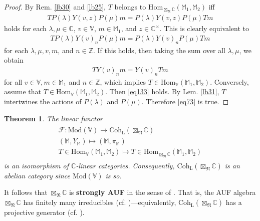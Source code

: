 \documentclass[11pt,b5paper,notitlepage]{article}
\theoremstyle{definition}
\theoremstyle{plain}
\newtheorem{thm}[df]{Theorem}
\newcommand{\Hom}{\mathrm{Hom}}
\newcommand{\scr}{\mathscr}
\newcommand{\Vbb}{\mathbb V}
\newcommand{\Mbb}{\mathbb M}
\newcommand{\Cbb}{\mathbb C}
\newcommand{\Zbb}{\mathbb Z}
\newcommand{\<}{\left\langle}
\renewcommand{\>}{\right\rangle}
\newcommand{\Mod}{\mathrm{Mod}}
\newcommand{\fn}{\mathfrak{N}}
\newcommand{\Coh}{{\mathrm{Coh}_{\mathrm L}}}
\numberwithin{equation}{section}
\begin{document}
\begin{proof}
By Rem. \ref{lb30} and \ref{lb25}, $T$ belongs to $\Hom_{\boxtimes_\fn\Cbb}(\Mbb_1,\Mbb_2)$ iff
\begin{align*}
TP(\lambda)Y(v,z)P(\mu)m=P(\lambda)Y(v,z)P(\mu)Tm
\end{align*}
holds for each $\lambda,\mu\in\Cbb$, $v\in\Vbb$, $m\in\Mbb_1$, and $z\in\Cbb^{\times}$. This is clearly equivalent to
\begin{align}\label{eq73}
TP(\lambda)Y(v)_nP(\mu)m=P(\lambda)Y(v)_nP(\mu)Tm
\end{align}
for each $\lambda,\mu,v,m$, and $n\in\Zbb$. If this holds, then taking the sum over all $\lambda,\mu$, we obtain
\begin{align}\label{eq133}
TY(v)_nm=Y(v)_nTm
\end{align}
for all $v\in\Vbb,m\in\Mbb_1$ and $n\in\Zbb$, which implies $T\in\Hom_\Vbb(\Mbb_1,\Mbb_2)$. Conversely, assume that $T\in\Hom_\Vbb(\Mbb_1,\Mbb_2)$. Then \eqref{eq133} holds. By Lem. \ref{lb31}, $T$ intertwines the actions of $P(\lambda)$ and $P(\mu)$. Therefore \eqref{eq73} is true.
\end{proof}




\begin{thm}\label{lb55}
The linear functor
\begin{gather}
\begin{gathered}
\scr F:\Mod(\Vbb)\rightarrow \Coh(\boxtimes_\fn\Cbb)\\
(\Mbb,Y_\Mbb)\mapsto (\Mbb,\pi_\Mbb)\\
T\in\Hom_\Vbb(\Mbb_1,\Mbb_2)\mapsto T\in\Hom_{\boxtimes_\fn\Cbb}(\Mbb_1,\Mbb_2)
\end{gathered}
\end{gather}
is an isomorphism of $\Cbb$-linear categories. Consequently, $\Coh(\boxtimes_\fn\Cbb)$ is an abelian category since $\Mod(\Vbb)$ is so.
\end{thm}


It follows that $\boxtimes_\fn\Cbb$ is \textbf{strongly AUF} in the sense of \cite{GZ4}. That is, the AUF algebra $\boxtimes_\fn\Cbb$ has finitely many irreducibles (cf. \cite[Cor. 6.4]{GZ4})---equivalently, $\Coh(\boxtimes_\fn\Cbb)$ has a projective generator (cf. \cite[Prop. 7.8]{GZ4}).
\end{document}

